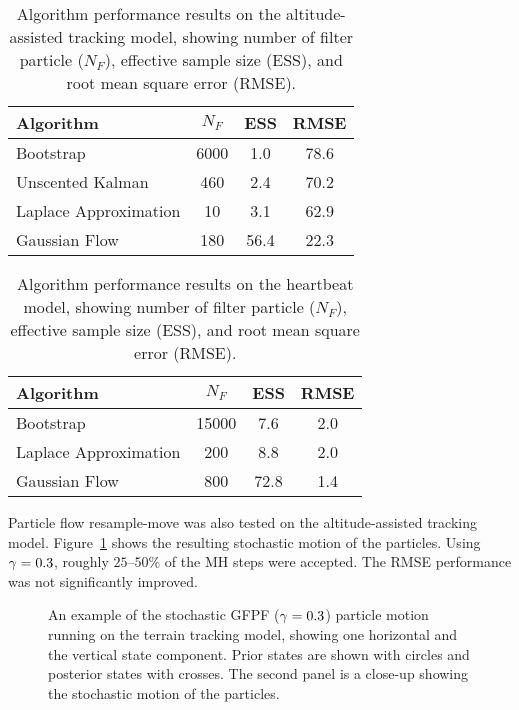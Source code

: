 \documentclass{article}
\begin{document}
\begin{table}
\centering
\begin{tabular}{l||c|c|c}
Algorithm                                & $N_F$ & ESS  & RMSE \\
\hline
Bootstrap                                &  6000 &  1.0 & 78.6 \\
Unscented Kalman                         &   460 &  2.4 & 70.2 \\
Laplace Approximation                    &    10 &  3.1 & 62.9 \\
Gaussian Flow                            &   180 & 56.4 & 22.3 \\
\end{tabular}
\caption{Algorithm performance results on the altitude-assisted tracking model, showing number of filter particle ($N_F$), effective sample size (ESS), and root mean square error (RMSE).}
\label{tab:drone_results_gaussian}
\end{table}

\begin{table}
\centering
\begin{tabular}{l||c|c|c}
Algorithm                                & $N_F$ & ESS  & RMSE \\
\hline
Bootstrap                                & 15000 &  7.6 &  2.0 \\
Laplace Approximation                    &   200 &  8.8 &  2.0 \\
Gaussian Flow                            &   800 & 72.8 &  1.4 \\
\end{tabular}
\caption{Algorithm performance results on the heartbeat model, showing number of filter particle ($N_F$), effective sample size (ESS), and root mean square error (RMSE).}
\label{tab:sineha_results}
\end{table}

Particle flow resample-move was also tested on the altitude-assisted tracking model. Figure~\ref{fig:drone_example_frame_stochastic} shows the resulting stochastic motion of the particles. Using $\gamma=0.3$, roughly $25$--$50\%$ of the MH steps were accepted. The RMSE performance was not significantly improved.
%
\begin{figure}
\centering
\subfloat[]{}
\subfloat[]{}
\caption{An example of the stochastic GFPF ($\gamma=0.3$) particle motion running on the terrain tracking model, showing one horizontal and the vertical state component. Prior states are shown with circles and posterior states with crosses. The second panel is a close-up showing the stochastic motion of the particles.}
\label{fig:drone_example_frame_stochastic}
\end{figure}
\end{document}
